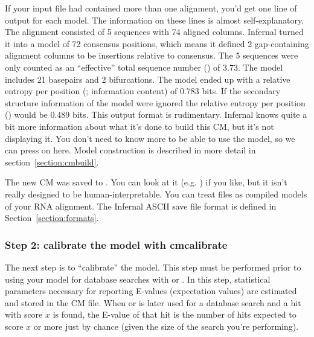 If your input file had contained more than one alignment, you'd get
one line of output for each model. The information on these lines is
almost self-explanatory. The  alignment consisted of 5
sequences with 74 aligned columns. Infernal turned it into a model of
72 consensus positions, which means it defined 2 gap-containing
alignment columns to be insertions relative to consensus. The 5
sequences were only counted as an ``effective'' total sequence number
() of 3.73. The model includes 21 basepairs and 2
bifurcations. The model ended up with a relative entropy per position
(; information content) of 0.783 bits. If the
secondary structure information of the model were ignored the relative
entropy per position () would be 0.489 bits.
This output format is rudimentary. Infernal knows quite a bit more
information about what it's done to build this CM, but it's not
displaying it. You don't need to know more to be able to use the
model, so we can press on here. Model construction is described in
more detail in section~\ref{section:cmbuild}.

The new CM was saved to . You can look at it
(e.g. ) if you like, but it isn't really designed
to be human-interpretable. You can treat  files as compiled
models of your RNA alignment. The Infernal ASCII save file format is
defined in Section~\ref{section:formats}.

\subsubsection{Step 2: calibrate the model with cmcalibrate}

The next step is to ``calibrate'' the model. This step must be
performed prior to using your model for database searches with
 or . In this step, statistical parameters
necessary for reporting E-values (expectation values) are estimated
and stored in the CM file. When  or  is
later used for a database search and a hit with score $x$ is found,
the E-value of that hit is the number of hits expected to score $x$ or
more just by chance (given the size of the search you're performing).

